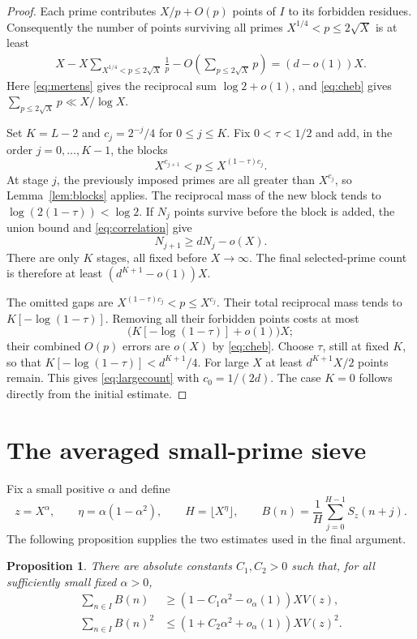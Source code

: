 \documentclass[11pt,reqno]{amsart}
\newtheorem{proposition}[theorem]{Proposition}
\theoremstyle{remark}
\numberwithin{equation}{section}
\begin{document}
\begin{proof}
Each prime contributes $X/p+O(p)$ points of $I$ to its forbidden
residues. Consequently the number of points surviving all primes
$X^{1/4}<p\leq2\sqrt X$ is at least
\begin{align*}
 X-X\sum_{X^{1/4}<p\leq2\sqrt X}\frac1p
 -O\left(\sum_{p\leq2\sqrt X}p\right)
 =(d-o(1))X.
\end{align*}
Here \eqref{eq:mertens} gives the reciprocal sum $\log2+o(1)$,
and \eqref{eq:cheb} gives $\sum_{p\leq2\sqrt X}p\ll X/\log X$.

Set $K=L-2$ and $c_j=2^{-j}/4$ for $0\leq j\leq K$.
Fix $0<\tau<1/2$ and add, in the order $j=0,\ldots,K-1$, the blocks
\[
 X^{c_{j+1}}<p\leq X^{(1-\tau)c_j}.
\]
At stage $j$, the previously imposed primes are all greater than
$X^{c_j}$, so Lemma~\ref{lem:blocks} applies. The reciprocal mass
of the new block tends to
$\log(2(1-\tau))<\log2$.
If $N_j$ points survive before the block is added, the union bound
and \eqref{eq:correlation} give
\[
 N_{j+1}\geq dN_j-o(X).
\]
There are only $K$ stages, all fixed before $X\to\infty$.
The final selected-prime count is therefore at least
$(d^{K+1}-o(1))X$.

The omitted gaps are
$X^{(1-\tau)c_j}<p\leq X^{c_j}$.
Their total reciprocal mass tends to $K[-\log(1-\tau)]$.
Removing all their forbidden points costs at most
\[
 \bigl(K[-\log(1-\tau)]+o(1)\bigr)X;
\]
their combined $O(p)$ errors are $o(X)$ by \eqref{eq:cheb}.
Choose $\tau$, still at fixed $K$, so that
$K[-\log(1-\tau)]<d^{K+1}/4$.
For large $X$ at least $d^{K+1}X/2$ points remain.
This gives \eqref{eq:largecount} with $c_0=1/(2d)$.
The case $K=0$ follows directly from the initial estimate.
\end{proof}

\section{The averaged small-prime sieve}\label{sec:small}

Fix a small positive $\alpha$ and define
\begin{equation}\label{eq:average}
 z=X^\alpha,\qquad
 \eta=\alpha(1-\alpha^2),\qquad
 H=\lfloor X^\eta\rfloor,\qquad
 B(n)=\frac1H\sum_{j=0}^{H-1}S_z(n+j).
\end{equation}
The following proposition supplies the two estimates used in the
final argument.

\begin{proposition}\label{prop:moments}
There are absolute constants $C_1,C_2>0$ such that, for all
sufficiently small fixed $\alpha>0$,
\begin{align}
 \sum_{n\in I}B(n)&\geq
 (1-C_1\alpha^2-o_\alpha(1))XV(z),\label{eq:first}\\
 \sum_{n\in I}B(n)^2&\leq
 (1+C_2\alpha^2+o_\alpha(1))XV(z)^2.\label{eq:second}
\end{align}
\end{proposition}
\end{document}

